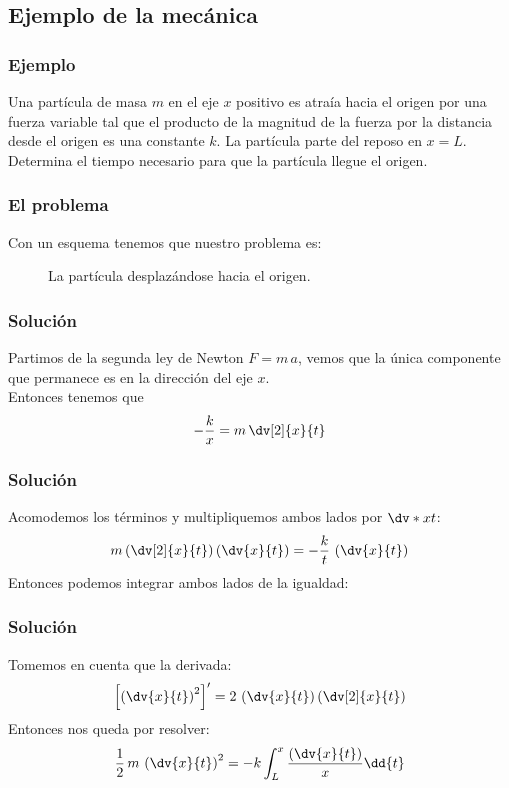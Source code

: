 \subsection{Ejemplo de la mecánica}

\begin{frame}
\frametitle{Ejemplo}
Una partícula de masa $m$ en el eje $x$ positivo es atraía hacia el origen por una fuerza variable tal que el producto de la magnitud de la fuerza por la distancia desde el origen es una constante $k$. La partícula parte del reposo en $x = L$.
\\
\bigskip
Determina el tiempo necesario para que la partícula llegue el origen.
\end{frame}
\begin{frame}
\frametitle{El problema}
Con un esquema tenemos que nuestro problema es:
\begin{figure}
    \centering
    
    \caption{La partícula desplazándose hacia el origen.}
\end{figure}
\end{frame}
\begin{frame}
\frametitle{Solución}
Partimos de la segunda ley de Newton $F = m \, a$, vemos que la única componente que permanece es en la dirección del eje $x$.
\\
\bigskip
Entonces tenemos que
\begin{align*}
- \dfrac{k}{x} = m \, \dv[2]{x}{t}
\end{align*}
\end{frame}
\begin{frame}
\frametitle{Solución}
Acomodemos los términos y multipliquemos ambos lados por $\dv*{x}{t}$:
\begin{align*}
m \left( \dv[2]{x}{t} \right) \left( \dv{x}{t} \right) = - \dfrac{k}{t} \,  \left( \dv{x}{t} \right)
\end{align*}
\pause
Entonces podemos integrar ambos lados de la igualdad:
\end{frame}
\begin{frame}
\frametitle{Solución}
Tomemos en cuenta que la derivada:
\begin{align*}
\left[ \left( \dv{x}{t} \right)^{2} \right]^{\prime} = 2 \, \left( \dv{x}{t} \right) \left( \dv[2]{x}{t} \right)
\end{align*}
\pause
Entonces nos queda por resolver:
\begin{align*}
\dfrac{1}{2} \, m \, \left( \dv{x}{t} \right)^{2} = - k \int_{L}^{x} \dfrac{\left( \dv{x}{t} \right)}{x} \dd{t}
\end{align*}
\end{frame}
